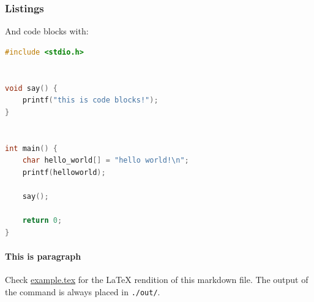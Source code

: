 \documentclass[12pt]{article}
\begin{document}
    \subsubsection{Listings}

    And code blocks with:

\begin{lstlisting}[language=C]
#include <stdio.h>


void say() {
    printf("this is code blocks!");
}


int main() {
    char hello_world[] = "hello world!\n";
    printf(helloworld);

    say();

    return 0;
}
\end{lstlisting}

    \paragraph{This is paragraph}

    Check \href{./example.tex}{example.tex} for the LaTeX rendition of this markdown file. The output of the command is always placed in \texttt{./out/}.
\end{document}
